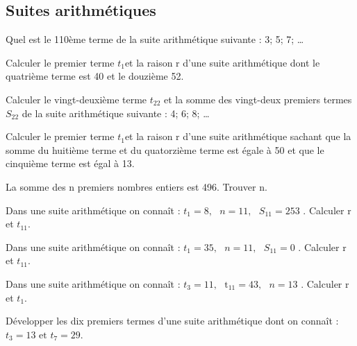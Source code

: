 \subsection{Suites arithmétiques}
\begin{exercice}
Quel est le 110ème terme de la suite arithmétique suivante : 3; 5; 7; …
\end{exercice}

\begin{exercice}
Calculer le premier terme ${{t}_{1}}$et la raison r d'une suite arithmétique dont le quatrième terme est 40 et le douzième 52.
\end{exercice}

\begin{exercice}
Calculer le vingt-deuxième terme ${{t}_{22}}$ et la somme des vingt-deux premiers termes ${{S}_{22}}$ de la suite arithmétique suivante : 4; 6; 8; … 
\end{exercice}

\begin{exercice}
Calculer le premier terme ${{t}_{1}}$et la raison r d'une suite arithmétique sachant que la somme du huitième terme et du quatorzième terme est égale à 50 et que le cinquième terme est égal à 13.
\end{exercice}

\begin{exercice}
La somme des n premiers nombres entiers est 496. Trouver n.
\end{exercice}

\begin{exercice}
Dans une suite arithmétique on connaît : ${{t}_{1}}=8,\text{ }n=11,\text{ }{{S}_{11}}=253$ . Calculer r et ${{t}_{11}}$.
\end{exercice}

\begin{exercice}
Dans une suite arithmétique on connaît : ${{t}_{1}}=35,\text{ }n=11,\text{ }{{S}_{11}}=0$ . Calculer r et ${{t}_{11}}$.
\end{exercice}

\begin{exercice}
Dans une suite arithmétique on connaît : ${{t}_{3}}=11,\text{ }{{\text{t}}_{\text{11}}}=43,\text{ }n=13$ . Calculer r et ${{t}_{1}}$.
\end{exercice}

\begin{exercice}
Développer les dix premiers termes d'une suite arithmétique dont on connaît : ${{t}_{3}}=13\text{ et }{{t}_{7}}=29$.
\end{exercice}

